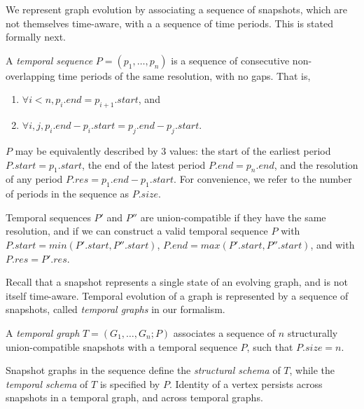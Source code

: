We represent graph evolution by associating a sequence of snapshots,
which are not themselves time-aware, with a a sequence of time
periods.  This is stated formally next.

\begin{definition} 
\label{def:tseq} 
A {\em temporal sequence} $P = (p_1, \ldots, p_n)$ is a
sequence of consecutive non-overlapping time periods of the same
resolution, with no gaps.  That is,

\begin{enumerate}
\item $\forall i < n, p_i.end = p_{i+1}.start$, and 
\item $\forall i, j, p_i.end - p_i.start = p_j.end - p_j.start$.
\end{enumerate}
\end{definition}

$P$ may be equivalently described by 3 values: the start of the
earliest period $P.start = p_1.start$, the end of the latest period
$P.end = p_n.end$, and the resolution of any period $P.res = p_1.end -
p_1.start$. For convenience, we refer to the number of periods in the
sequence as $P.size$.  


\begin{definition} 
\label{def:tcompat} 
Temporal sequences $P'$ and $P''$ are union-compatible if they have
the same resolution, and if we can construct a valid temporal sequence
$P$ with $P.start = min(P'.start, P''.start)$, $P.end = max(P'.start,
P''.start)$, and with $P.res = P'.res$.
\end{definition}

Recall that a snapshot represents a single state of an evolving graph,
and is not itself time-aware.  Temporal evolution of a graph is
represented by a sequence of snapshots, called {\em temporal graphs}
in our formalism. 

\begin{definition} 
\label{def:tgraph} 
A {\em temporal graph} $T = (G_1, \ldots, G_n; P)$ associates a
sequence of $n$ structurally union-compatible snapshots with a
temporal sequence $P$, such that $P.size = n$.
\end{definition}

Snapshot graphs in the sequence define the {\em structural schema} of
$T$, while the {\em temporal schema} of $T$ is specified by $P$.
Identity of a vertex persists across snapshots in a temporal graph,
and across temporal graphs.

